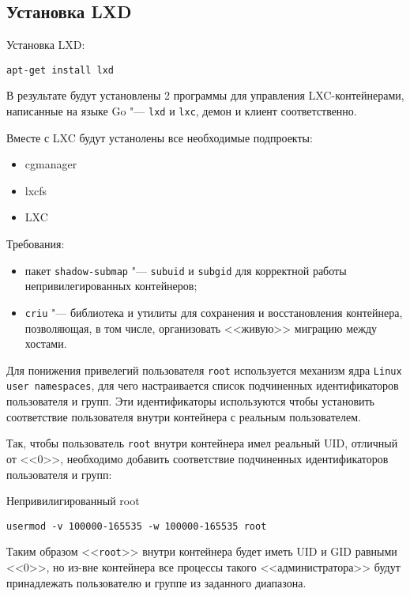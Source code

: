 \documentclass[10pt, a5paper]{article}
\begin{document}
\subsection*{Установка LXD}
Установка LXD:
\begin{verbatim}
apt-get install lxd
\end{verbatim}

В результате будут установлены 2 программы для управления LXC-контейнерами, написанные на 
языке Go "--- {\tt lxd} и {\tt lxc}, демон и клиент соответственно.

Вместе с LXC будут устанолены все необходимые подпроекты:
\begin{itemize}
    \item cgmanager
    \item lxcfs
    \item LXC
\end{itemize}

Требования:
\begin{itemize}
    \item пакет {\tt shadow-submap} "--- {\tt subuid} и {\tt subgid} для 
          корректной работы непривилегированных контейнеров;
    \item {\tt criu} "--- библиотека и утилиты для сохранения и
        восстановления контейнера, позволяющая, в том числе, организовать
        <<живую>> миграцию между хостами.
\end{itemize}

Для понижения привелегий пользователя {\tt root} используется
механизм ядра {\tt Linux user namespaces}, для чего настраивается
список подчиненных идентификаторов пользователя и групп.
Эти идентификаторы используются чтобы установить соответствие пользователя
внутри контейнера с реальным пользователем.

Так, чтобы пользователь {\tt root} внутри контейнера имел реальный UID,
отличный от <<0>>, необходимо добавить соответствие 
подчиненных идентификаторов пользователя и групп:

\begin{frame}{Непривилигированный root}

\begin{verbatim}
usermod -v 100000-165535 -w 100000-165535 root
\end{verbatim}

Таким образом <<{\tt root}>> внутри контейнера будет иметь UID и GID равными <<0>>,
но из-вне контейнера все процессы такого <<администратора>> будут принадлежать
пользователю и группе из заданного диапазона.
\end{frame}
\end{document}

